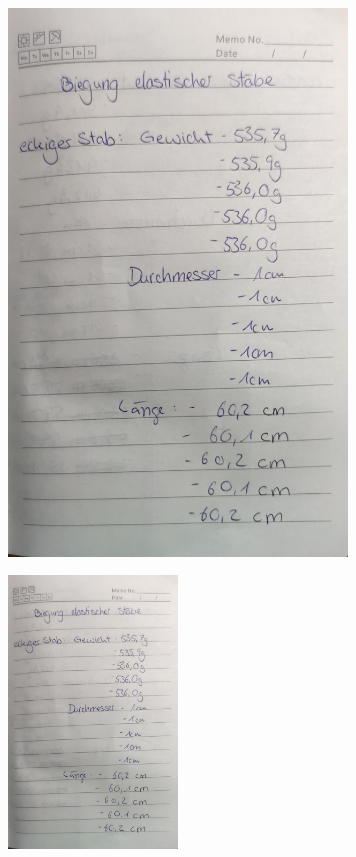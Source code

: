\begin{figure}
    \includegraphics[page=5, width=9cm]{Bilder/Messwerte.pdf}
\end{figure}
\begin{figure}
    \includegraphics[page=6, width=4.5cm]{Bilder/Messwerte.pdf}
\end{figure}
